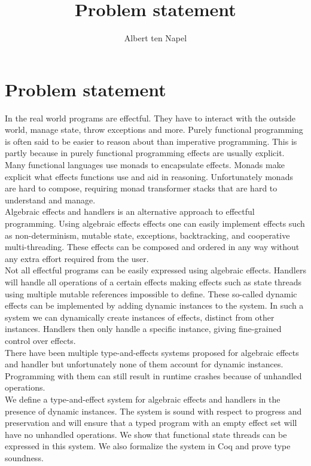 \documentclass[12pt]{article}
\title{Problem statement}
\author{Albert ten Napel}
\date{}
\begin{document}
\maketitle




\section{Problem statement}
In the real world programs are effectful. They have to interact with the outside world, manage state, throw exceptions and more.
Purely functional programming is often said to be easier to reason about than imperative programming.
This is partly because in purely functional programming effects are usually explicit.
Many functional languages use monads to encapsulate effects.
Monads make explicit what effects functions use and aid in reasoning.
Unfortunately monads are hard to compose, requiring monad transformer stacks that are hard to understand and manage.
\\
Algebraic effects and handlers is an alternative approach to effectful programming.
Using algebraic effects effects one can easily implement effects such as non-determinism, mutable state, exceptions, backtracking, and cooperative multi-threading.
These effects can be composed and ordered in any way without any extra effort required from the user.
\\
Not all effectful programs can be easily expressed using algebraic effects.
Handlers will handle all operations of a certain effects making effects such as state threads using multiple mutable references impossible to define.
These so-called dynamic effects can be implemented by adding dynamic instances to the system.
In such a system we can dynamically create instances of effects, distinct from other instances.
Handlers then only handle a specific instance, giving fine-grained control over effects.
\\
There have been multiple type-and-effects systems proposed for algebraic effects and handler but unfortunately none of them account for dynamic instances. Programming with them can still result in runtime crashes because of unhandled operations.
\\
We define a type-and-effect system for algebraic effects and handlers in the presence of dynamic instances.
The system is sound with respect to progress and preservation and will ensure that a typed program with an empty effect set will have no unhandled operations.
We show that functional state threads can be expressed in this system.
We also formalize the system in Coq and prove type soundness.
\end{document}
